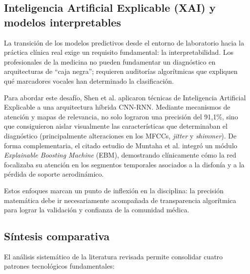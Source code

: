 \subsection{Inteligencia Artificial Explicable (XAI) y modelos interpretables}

La transición de los modelos predictivos desde el entorno de laboratorio hacia la práctica clínica real exige un requisito fundamental: la interpretabilidad. Los profesionales de la medicina no pueden fundamentar un diagnóstico en arquitecturas de ``caja negra''; requieren auditorías algorítmicas que expliquen qué marcadores vocales han determinado la clasificación.

Para abordar este desafío, Shen et al. \cite{shen2024} aplicaron técnicas de Inteligencia Artificial Explicable a una arquitectura híbrida CNN-RNN. Mediante mecanismos de atención y mapas de relevancia, no solo lograron una precisión del 91,1\%, sino que consiguieron aislar visualmente las características que determinaban el diagnóstico (principalmente alteraciones en los MFCCs, \textit{jitter} y \textit{shimmer}). De forma complementaria, el citado estudio de Muntaha et al. \cite{muntaha2024} integró un módulo \textit{Explainable Boosting Machine} (EBM), demostrando clínicamente cómo la red focalizaba su atención en los segmentos temporales asociados a la disfonía y a la pérdida de soporte aerodinámico.

Estos enfoques marcan un punto de inflexión en la disciplina: la precisión matemática debe ir necesariamente acompañada de transparencia algorítmica para lograr la validación y confianza de la comunidad médica.

\subsection{Síntesis comparativa}

El análisis sistemático de la literatura revisada permite consolidar cuatro patrones tecnológicos fundamentales:

